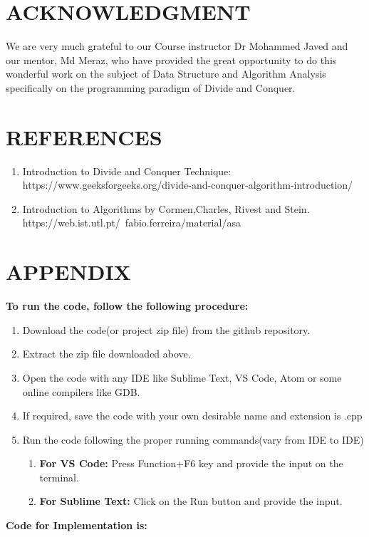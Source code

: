 \documentclass[10pt]{article}
\begin{document}
\begin{multicols*}{2}
\section*{ACKNOWLEDGMENT}

We are very much grateful to our Course instructor Dr Mohammed Javed and our mentor, Md Meraz, who have provided the great opportunity to do this wonderful work on the subject of Data Structure and Algorithm Analysis specifically on the programming paradigm of Divide and Conquer.

\section*{REFERENCES}

\begin{enumerate}
\item Introduction to Divide and Conquer Technique:\\
https://www.geeksforgeeks.org/divide-and-conquer-algorithm-introduction/
\item Introduction to Algorithms by Cormen,Charles, Rivest and Stein.\\
https://web.ist.utl.pt/~fabio.ferreira/material/asa
\end{enumerate}
\end{multicols*}

\newpage
\section*{APPENDIX}
\textbf{To run the code, follow the following procedure:}\\
\begin{enumerate}
    \item Download the code(or project zip file) from the github repository.
    \item Extract the zip file downloaded above.
    \item Open the code with any IDE like Sublime Text, VS Code, Atom or some online compilers like GDB.
    \item If required, save the code with your own desirable name and extension is .cpp
    \item Run the code following the proper running commands(vary from IDE to IDE)
    \begin{enumerate}
        \item \textbf{For VS Code:} Press Function+F6 key and provide the input on the terminal.
        \item \textbf{For Sublime Text:} Click on the Run button and provide the input.\\
    \end{enumerate}
\end{enumerate}
\textbf{Code for Implementation is:}
\end{document}
